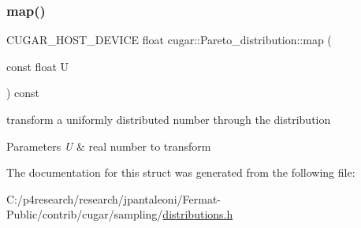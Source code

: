 \subsubsection{\texorpdfstring{map()}{map()}}
{\footnotesize\ttfamily C\+U\+G\+A\+R\+\_\+\+H\+O\+S\+T\+\_\+\+D\+E\+V\+I\+CE float cugar\+::\+Pareto\+\_\+distribution\+::map (\begin{DoxyParamCaption}\item[{const float}]{U }\end{DoxyParamCaption}) const\hspace{0.3cm}{\ttfamily [inline]}}

transform a uniformly distributed number through the distribution


\begin{DoxyParams}{Parameters}
{\em U} & real number to transform \\
\hline
\end{DoxyParams}


The documentation for this struct was generated from the following file\+:\begin{DoxyCompactItemize}
\item 
C\+:/p4research/research/jpantaleoni/\+Fermat-\/\+Public/contrib/cugar/sampling/\hyperlink{distributions_8h}{distributions.\+h}\end{DoxyCompactItemize}
